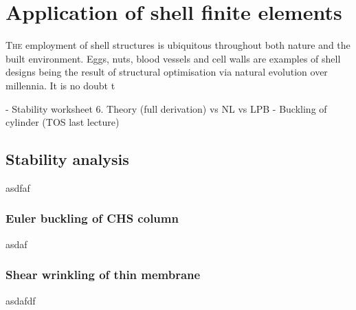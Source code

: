 



\chapter{Application of shell finite elements}
\label{chap:chapter_application}

\renewcommand{\Thema}{Application of shell finite elements}

\lettrine[lines=2]{T}{he} employment of shell structures is ubiquitous throughout both nature and the built environment. Eggs, nuts, blood vessels and cell walls are examples of shell designs being the result of structural optimisation via natural evolution over millennia. It is no doubt t

- Stability worksheet 6. Theory (full derivation) vs NL vs LPB
- Buckling of cylinder (TOS last lecture)

\section{Stability analysis}

asdfaf

\subsection{Euler buckling of CHS column}
\label{applications: Euler buckling of CHS column}
asdaf

\subsection{Shear wrinkling of thin membrane}

asdafdf

